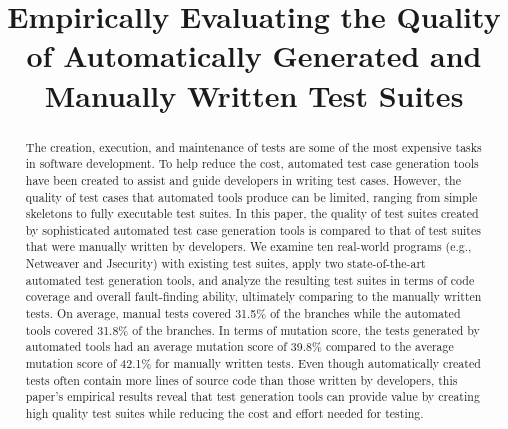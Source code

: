\documentclass[conference]{IEEEtran}
\begin{document}
\title{Empirically Evaluating the Quality of Automatically Generated and Manually Written Test Suites}

\author{
\and
{}
}

\maketitle
\begin{abstract}

  The creation, execution, and maintenance of tests are some of the most expensive tasks in software development. To help reduce the cost, automated test case generation tools have been created to assist and guide developers in writing test cases. However, the quality of test cases that automated tools produce can be limited, ranging from simple skeletons to fully executable test suites.  In this paper, the quality of test suites created by sophisticated automated test case generation tools is compared to that of test suites that were manually written by developers. We examine ten real-world programs (e.g., Netweaver and Jsecurity) with existing test suites, apply two state-of-the-art automated test generation tools, and analyze the resulting test suites in terms of code coverage and overall fault-finding ability, ultimately comparing to the manually written tests. On average, manual tests covered 31.5\% of the branches while the automated tools covered 31.8\% of the branches. In terms of mutation score, the tests generated by automated tools had an average mutation score of 39.8\% compared to the average mutation score of 42.1\% for manually written tests.  Even though automatically created tests often contain more lines of source code than those written by developers, this paper's empirical results reveal that test generation tools can provide value by creating high quality test suites while reducing the cost and effort needed for testing.  

\end{abstract}









\end{document}
